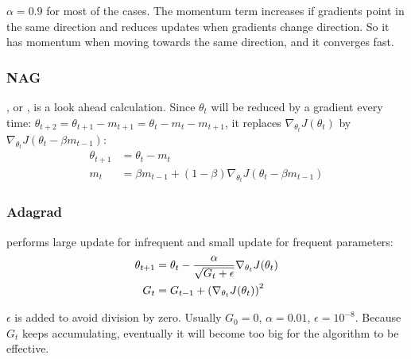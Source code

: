$\alpha=0.9$ for most of the cases. The momentum term increases if gradients point in the same direction and reduces updates when gradients change direction. So it has momentum when moving towards the same direction, and it converges fast.





\subsubsection{NAG}

\cite{NESTEROV1983}, or , is a look ahead calculation. Since $\theta_t$ will be reduced by a gradient every time: $\theta_{t+2} = \theta_{t+1} - m_{t+1} = \theta_t - m_t - m_{t+1}$, it replaces $\nabla_{\theta_t} J(\theta_t)$ by $\nabla_{\theta_t} J(\theta_t - \beta m_{t-1})$:
\begin{equation}
    \begin{aligned}
        \theta_{t+1} &= \theta_t - m_t \\
        m_t &= \beta m_{t-1} + (1-\beta) \nabla_{\theta_t} J(\theta_t - \beta m_{t-1})
    \end{aligned}
\end{equation}




\subsubsection{Adagrad}

\cite{Duchi2012} performs large update for infrequent and small update for frequent parameters:
\begin{equation}
    \begin{aligned}
        \theta_{t+1} &= \theta_t - \frac{\alpha}{\sqrt{G_t + \epsilon}}  \nabla_{\theta_t} J(\theta_t) \\
        G_t &= G_{t-1} + \mleft(\nabla_{\theta_t} J(\theta_t) \mright)^2
    \end{aligned}
\end{equation}

$\epsilon$ is added to avoid division by zero. Usually $G_0 = 0$, $\alpha = 0.01$, $\epsilon = 10^{-8}$. Because $G_t$ keeps accumulating, eventually it will become too big for the algorithm to be effective.




